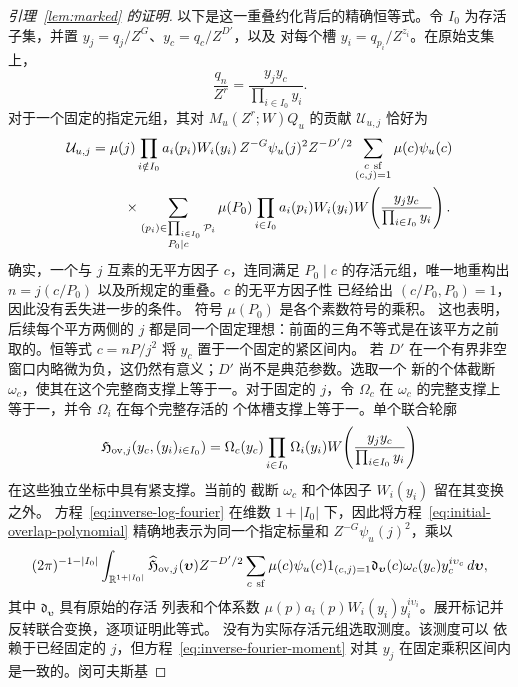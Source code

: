 \documentclass[11pt,a4paper]{article}
\numberwithin{equation}{section}
\numberwithin{figure}{section}
\theoremstyle{definition}
\theoremstyle{remark}
\begin{document}
\begin{proof}[引理~\ref{lem:marked} 的证明]
以下是这一重叠约化背后的精确恒等式。令
\(I_0\) 为存活子集，并置
\(y_j=q_j/Z^G\)、\(y_c=q_c/Z^{D'}\)，以及
对每个槽 \(y_i=q_{p_i}/Z^{z_i}\)。在原始支集上，
\[
 \frac{q_n}{Z^r}=\frac{y_jy_c}{\prod_{i\in I_0}y_i}.
\]
对于一个固定的指定元组，其对
\(M_u(Z^r;W)Q_u\) 的贡献 \(\mathcal U_{u,j}\) 恰好为
\begin{equation}\label{eq:initial-overlap-polynomial}
 \begin{split}
 \mathcal U_{u,j}={}&\mu(j)
 \prod_{i\notin I_0}a_i(p_i)W_i(y_i)\,
 Z^{-G}\psi_u(j)^2 Z^{-D'/2}
 \sum_{\substack{c\ {\rm sf}\\(c,j)=1}}\mu(c)\psi_u(c)\\
 &\quad\times
 \sum_{\substack{(p_i)\in\prod_{i\in I_0}\mathcal P_i\\P_0\mid c}}
 \mu(P_0)\prod_{i\in I_0}a_i(p_i)W_i(y_i)
 W\!\left(\frac{y_jy_c}{\prod_{i\in I_0}y_i}\right).
 \end{split}
\end{equation}
确实，一个与 \(j\) 互素的无平方因子 \(c\)，连同满足
\(P_0\mid c\) 的存活元组，唯一地重构出
\(n=j(c/P_0)\) 以及所规定的重叠。\(c\) 的无平方因子性
已经给出 \((c/P_0,P_0)=1\)，因此没有丢失进一步的条件。
符号 \(\mu(P_0)\) 是各个素数符号的乘积。
这也表明，后续每个平方两侧的 \(j\) 都是同一个固定理想：前面的三角不等式是在该平方之前取的。恒等式 \(c=nP/j^2\) 将 \(y_c\) 置于一个固定的紧区间内。
若 \(D'\) 在一个有界非空窗口内略微为负，这仍然有意义；\(D'\) 尚不是典范参数。选取一个
新的个体截断 \(\omega_c\)，使其在这个完整商支撑上等于一。对于固定的 \(j\)，令 \(\Omega_c\) 在
\(\omega_c\) 的完整支撑上等于一，并令 \(\Omega_i\) 在每个完整存活的
个体槽支撑上等于一。单个联合轮廓
\[
 \mathfrak H_{{\rm ov},j}(y_c,(y_i)_{i\in I_0})
 =\Omega_c(y_c)\prod_{i\in I_0}\Omega_i(y_i)
 W\!\left(\frac{y_jy_c}{\prod_{i\in I_0}y_i}\right)
\]
在这些独立坐标中具有紧支撑。当前的
截断 \(\omega_c\) 和个体因子 \(W_i(y_i)\) 留在其变换之外。
方程~\eqref{eq:inverse-log-fourier} 在维数
\(1+|I_0|\) 下，因此将方程~\eqref{eq:initial-overlap-polynomial}
精确地表示为同一个指定标量和 \(Z^{-G}\psi_u(j)^2\)，乘以
\[
 (2\pi)^{-1-|I_0|}\int_{\mathbb R^{1+|I_0|}}
 \widehat{\mathfrak H}_{{\rm ov},j}(\boldsymbol\upsilon)
 Z^{-D'/2}\sum_{c\ {\rm sf}}\mu(c)\psi_u(c)1_{(c,j)=1}
 \mathfrak d_{\boldsymbol\upsilon}(c)
 \omega_c(y_c)y_c^{i\upsilon_c}\,d\boldsymbol\upsilon,
\]
其中 \(\mathfrak d_{\boldsymbol\upsilon}\) 具有原始的存活
列表和个体系数
\(\mu(p)a_i(p)W_i(y_i)y_i^{i\upsilon_i}\)。展开标记并
反转联合变换，逐项证明此等式。
没有为实际存活元组选取测度。该测度可以
依赖于已经固定的 \(j\)，但方程~\eqref{eq:inverse-fourier-moment}
对其 \(y_j\) 在固定乘积区间内是一致的。闵可夫斯基

\end{proof}
\end{document}
